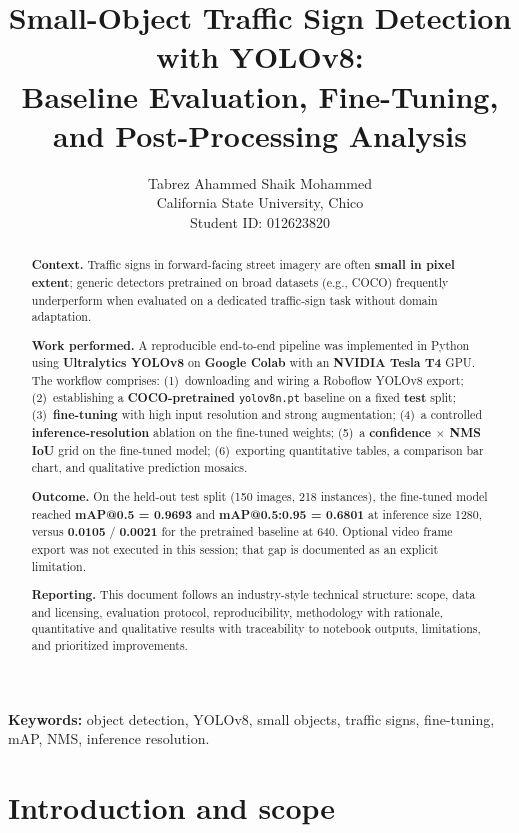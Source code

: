 \documentclass[11pt,a4paper]{article}
\title{\textbf{Small-Object Traffic Sign Detection with YOLOv8:}\\[0.3em]
\large Baseline Evaluation, Fine-Tuning, and Post-Processing Analysis}
\author{Tabrez Ahammed Shaik Mohammed\\California State University, Chico\\Student ID: 012623820}
\date{}
\begin{document}
\maketitle

\begin{abstract}
\noindent
\textbf{Context.} Traffic signs in forward-facing street imagery are often \textbf{small in pixel extent}; generic detectors pretrained on broad datasets (e.g., COCO) frequently underperform when evaluated on a dedicated traffic-sign task without domain adaptation.

\textbf{Work performed.} A reproducible end-to-end pipeline was implemented in Python using \textbf{Ultralytics YOLOv8} on \textbf{Google Colab} with an \textbf{NVIDIA Tesla T4} GPU. The workflow comprises: (1)~downloading and wiring a Roboflow YOLOv8 export; (2)~establishing a \textbf{COCO-pretrained} \texttt{yolov8n.pt} baseline on a fixed \textbf{test} split; (3)~\textbf{fine-tuning} with high input resolution and strong augmentation; (4)~a controlled \textbf{inference-resolution} ablation on the fine-tuned weights; (5)~a \textbf{confidence $\times$ NMS IoU} grid on the fine-tuned model; (6)~exporting quantitative tables, a comparison bar chart, and qualitative prediction mosaics.

\textbf{Outcome.} On the held-out test split (\num{150} images, \num{218} instances), the fine-tuned model reached \textbf{mAP@0.5 = \num{0.9693}} and \textbf{mAP@0.5:0.95 = \num{0.6801}} at inference size \num{1280}, versus \textbf{\num{0.0105}} / \textbf{\num{0.0021}} for the pretrained baseline at \num{640}. Optional video frame export was not executed in this session; that gap is documented as an explicit limitation.

\textbf{Reporting.} This document follows an industry-style technical structure: scope, data and licensing, evaluation protocol, reproducibility, methodology with rationale, quantitative and qualitative results with traceability to notebook outputs, limitations, and prioritized improvements.
\end{abstract}

\noindent\textbf{Keywords:} object detection, YOLOv8, small objects, traffic signs, fine-tuning, mAP, NMS, inference resolution.

\tableofcontents
\vspace{1em}

\section{Introduction and scope}
\end{document}
